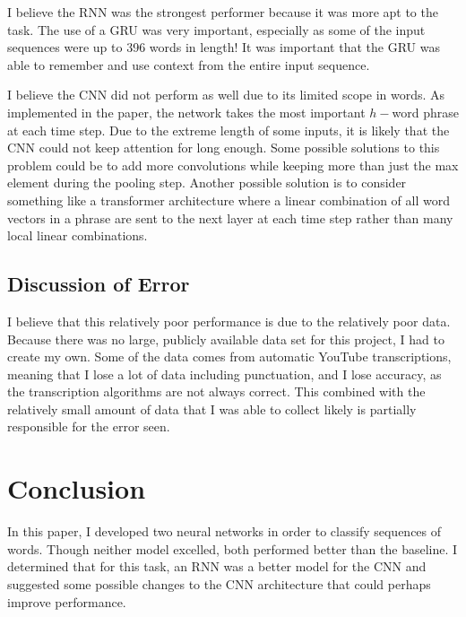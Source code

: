 \documentclass{article}
\begin{document}
I believe the RNN was the strongest performer because it was more apt to the task. The use of a GRU was very important, especially as some of the input sequences were up to 396 words in length! It was important that the GRU was able to remember and use context from the entire input sequence.

I believe the CNN did not perform as well due to its limited scope in words. As implemented in the paper, the network takes the most important $h-$word phrase at each time step. Due to the extreme length of some inputs, it is likely that the CNN could not keep attention for long enough. Some possible solutions to this problem could be to add more convolutions while keeping more than just the max element during the pooling step. Another possible solution is to consider something like a transformer architecture where a linear combination of all word vectors in a phrase are sent to the next layer at each time step rather than many local linear combinations.

\subsection{Discussion of Error}
I believe that this relatively poor performance is due to the relatively poor data. Because there was no large, publicly available data set for this project, I had to create my own. Some of the data comes from automatic YouTube transcriptions, meaning that I lose a lot of data including punctuation, and I lose accuracy, as the transcription algorithms are not always correct. This combined with the relatively small amount of data that I was able to collect likely is partially responsible for the error seen.

\section{Conclusion}
In this paper, I developed two neural networks in order to classify sequences of words. Though neither model excelled, both performed better than the baseline. I determined that for this task, an RNN was a better model for the CNN and suggested some possible changes to the CNN architecture that could perhaps improve performance.

  
\end{document}
